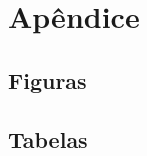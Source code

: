 \documentclass[
	12pt,				%
	oneside,			%
	a4paper,			%
	english,			%
	brazil				%
	]{abntex2ppgsi}
\begin{document}



% 

\newpage



\newpage
\chapter{Apêndice}
\section{Figuras}
\section{Tabelas}

\end{document}
